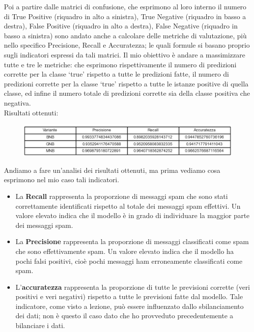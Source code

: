 \documentclass[]{article}
\begin{document}
                    Poi a partire dalle matrici di confusione, che esprimono al loro interno il numero di True Positive (riquadro in alto a sinistra), True Negative (riquadro in basso a destra), False Positive (riquadro in alto a destra), False Negative (riquadro in basso a sinistra) sono andato anche a calcolare delle metriche di valutazione, più nello specifico Precisione, Recall e Accuratezza; le quali formule si basano proprio sugli indicatori espressi da tali matrici. Il mio obiettivo è andare a massimizzare tutte e tre le metriche: che esprimono rispettivamente il numero di predizioni corrette per la classe ‘true’ rispetto a tutte le predizioni fatte, il numero di predizioni corrette per la classe ‘true’ rispetto a tutte le istanze positive di quella classe, ed infine il numero totale di predizioni corrette sia della classe positiva che negativa.\\
                    Risultati ottenuti:
                    \begin{figure}[H]
                        \centering
                        \includegraphics[width=1\linewidth]{images/resultTableNaiveBayes.png}
                        \label{fig:enter-label}
                    \end{figure}
                    Andiamo a fare un'analisi dei risultati ottenuti, ma prima vediamo cosa esprimono nel mio caso tali indicatori.
                    \begin{itemize}
                        \item La \textbf{Recall} rappresenta la proporzione di messaggi spam che sono stati correttamente identificati rispetto al totale dei messaggi spam effettivi. Un valore elevato indica che il modello è in grado di individuare la maggior parte dei messaggi spam.
                        \item La \textbf{Precisione} rappresenta la proporzione di messaggi classificati come spam che sono effettivamente spam. Un valore elevato indica che il modello ha pochi falsi positivi, cioè pochi messaggi ham erroneamente classificati come spam.
                        \item L'\textbf{accuratezza} rappresenta la proporzione di tutte le previsioni corrette (veri positivi e veri negativi) rispetto a tutte le previsioni fatte dal modello. Tale indicatore, come visto a lezione, può essere influenzato dallo sbilanciamento dei dati; non è questo il caso dato che ho provveduto precedentemente a bilanciare i dati.
                    \end{itemize}
\end{document}
